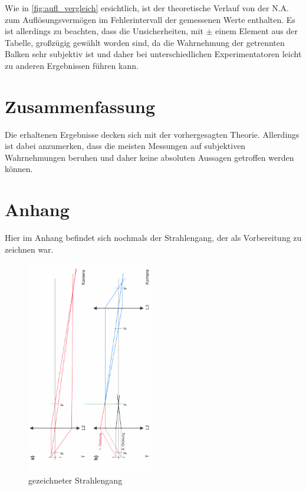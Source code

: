 \documentclass[11pt,ngerman]{scrartcl}
\begin{document}
Wie in \autoref{fig:aufl_vergleich} ersichtlich, ist der theoretische Verlauf von der N.A. zum Auflösungsvermögen im Fehlerintervall der gemessenen Werte enthalten. Es ist allerdings zu beachten, dass die Unsicherheiten, mit $\pm$ einem Element aus der Tabelle, großzügig gewählt worden sind, da die Wahrnehmung der getrennten Balken sehr subjektiv ist und daher bei unterschiedlichen Experimentatoren leicht zu anderen Ergebnissen führen kann.

\vspace{5mm}

\section{Zusammenfassung}

Die erhaltenen Ergebnisse decken sich mit der vorhergesagten Theorie. Allerdings ist dabei anzumerken, dass die meisten Messungen auf subjektiven Wahrnehmungen beruhen und daher keine absoluten Aussagen getroffen werden können.

\newpage

\section{Anhang}

Hier im Anhang befindet sich nochmals der Strahlengang, der als Vorbereitung zu zeichnen war.

\vspace{2mm}

\begin{figure}[H]
	\begin{center}
		\includegraphics[width=0.5\textwidth]{anhang_abbe}
	\end{center}
	\caption{gezeichneter Strahlengang}
	\label{fig:zeich}
\end{figure}

\newpage

\printbibliography
\listoffigures
\listoftables
\end{document}
